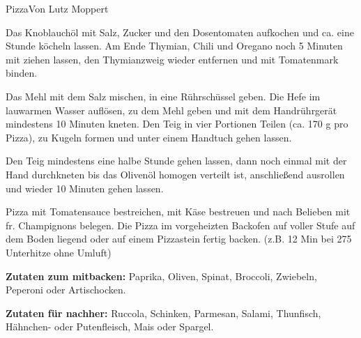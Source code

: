 \begin{recipe}{Pizza}{Von Lutz Moppert}
  \label{Pizza}
  
  
  \steps 
  Das Knoblauchöl mit Salz, Zucker und den Dosentomaten aufkochen und ca. eine Stunde
  köcheln lassen. Am Ende Thymian, Chili und Oregano noch 5 Minuten mit ziehen lassen, den
  Thymianzweig wieder entfernen und mit Tomatenmark binden.

  Das Mehl mit dem Salz mischen, in eine Rührschüssel geben. Die Hefe im lauwarmen Wasser
  auflösen, zu dem Mehl geben und mit dem Handrührgerät mindestens 10 Minuten kneten.  Den
  Teig in vier Portionen Teilen (ca. 170 g pro Pizza), zu Kugeln formen und unter einem 
  Handtuch gehen lassen.
  
  Den Teig mindestens eine halbe Stunde gehen lassen, dann noch einmal mit der Hand
  durchkneten bis das Olivenöl homogen verteilt ist, anschließend ausrollen und wieder 10
  Minuten gehen lassen.

  Pizza mit Tomatensauce bestreichen, mit Käse bestreuen und nach Belieben mit fr.
  Champignons belegen. Die Pizza im vorgeheizten Backofen auf voller Stufe auf dem Boden
  liegend oder auf einem Pizzastein fertig backen. (z.B. 12 Min bei 275 \celsius
  Unterhitze ohne Umluft)

  \textbf{Zutaten zum mitbacken:} 
  Paprika, Oliven, Spinat, Broccoli, Zwiebeln, Peperoni oder Artischocken.

  \textbf{Zutaten für nachher:} 
  Ruccola, Schinken, Parmesan, Salami, Thunfisch,   Hähnchen- oder Putenfleisch, Mais oder Spargel.

\end{recipe}
